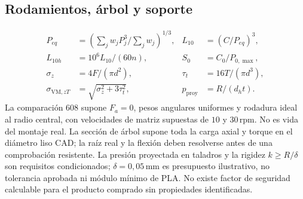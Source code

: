 \subsection{Rodamientos, árbol y soporte}
\begin{align}
P_{eq}&=\left(\sum_jw_jP_j^3/\sum_jw_j\right)^{1/3},&L_{10}&=(C/P_{eq})^3,\\
L_{10h}&=10^6L_{10}/(60n),&S_0&=C_0/P_{0,\max},\\
\sigma_z&=4F/(\pi d^2),&\tau_t&=16T/(\pi d^3),\\
\sigma_{\mathrm{VM},zT}&=\sqrt{\sigma_z^2+3\tau_t^2},&p_{\mathrm{proy}}&=R/(d_h t).
\end{align}
La comparación 608 supone $F_a=0$, pesos angulares uniformes y rodadura ideal al radio central,
con velocidades de matriz supuestas de $10$ y $30\,\mathrm{rpm}$. No es vida del montaje real.
La sección de árbol supone toda la carga axial y torque en el diámetro liso CAD;
la raíz real y la flexión deben resolverse antes de una comprobación resistente.
La presión proyectada en taladros y la rigidez $k\geq R/\delta$ son requisitos condicionados;
$\delta=0,05\,\mathrm{mm}$ es presupuesto ilustrativo, no tolerancia aprobada ni módulo mínimo de PLA.
No existe factor de seguridad calculable para el producto comprado sin propiedades identificadas.
